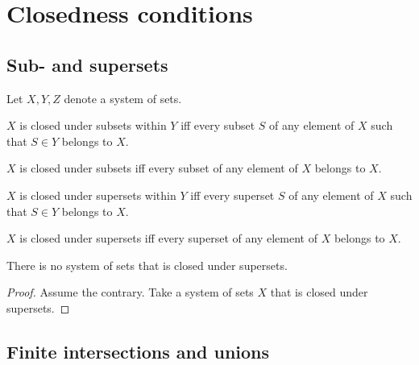 \documentclass[../../basic-notions.ftl.tex]{subfiles}
\begin{document}


  \section{Closedness conditions}

  \subsection{Sub- and supersets}

  \begin{forthel}
    Let $X, Y, Z$ denote a system of sets.

    \begin{definition}
      $X$ is closed under subsets within $Y$ iff every subset $S$ of any element of $X$ such that $S \in Y$ belongs to $X$.
    \end{definition}

    \begin{definition}
      $X$ is closed under subsets iff every subset of any element of $X$ belongs to $X$.
    \end{definition}

    \begin{definition}
      $X$ is closed under supersets within $Y$ iff every superset $S$ of any element of $X$ such that $S \in Y$ belongs to $X$.
    \end{definition}

    \begin{definition}
      $X$ is closed under supersets iff every superset of any element of $X$ belongs to $X$.
    \end{definition}

    \begin{proposition}
      There is no system of sets that is closed under supersets.
    \end{proposition}
    \begin{proof}
      Assume the contrary.
      Take a system of sets $X$ that is closed under supersets.
    \end{proof}
  \end{forthel}


  \subsection{Finite intersections and unions}
\end{document}
